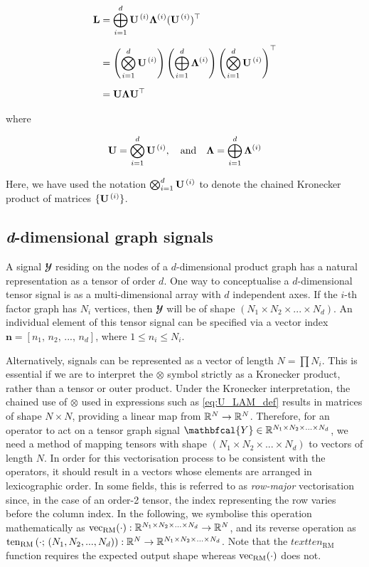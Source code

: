 \begin{align}
    \mathbf{L} &= \bigoplus_{i=1}^d \mathbf{U}^{\,(i)} \mathbf{\Lambda}^{(i)} (\mathbf{U}^{\,(i)})^\top \notag \\[0.2cm]
    &= \left( \bigotimes_{i=1}^d  \mathbf{U}^{\,(i)} \right) \left(\bigoplus_{i=1}^d \mathbf{\Lambda}^{(i)} \right) \left(\bigotimes_{i=1}^d  \mathbf{U}^{\,(i)} \right)^\top \notag \\[0.2cm]
    &= \mathbf{U} \mathbf{\Lambda} \mathbf{U}^\top 
\end{align}

\noindent where 

\begin{equation}
    \label{eq:U_LAM_def}
    \mathbf{U} =  \bigotimes_{i=1}^d  \mathbf{U}^{\,(i)} , \quad \text{and} \quad \mathbf{\Lambda} =  \bigoplus_{i=1}^d \mathbf{\Lambda}^{(i)}
\end{equation}


Here, we have used the notation $\bigotimes_{i=1}^d  \mathbf{U}^{\,(i)}$ to denote the chained Kronecker product of matrices $\{\mathbf{U}^{\,(i)}  \}$. 

\subsection{\textit{d}-dimensional graph signals}

A signal $\mathbfcal{Y}$ residing on the nodes of a $d$-dimensional product graph has a natural representation as a tensor of order $d$. One way to conceptualise a $d$-dimensional tensor signal is as a multi-dimensional array with $d$ independent axes. If the $i$-th factor graph has $N_i$ vertices, then $\mathbfcal{Y}$ will be of shape $(N_1 \times N_2 \times ... \times N_d)$. An individual element of this tensor signal can be specified via a vector index $\mathbf{n} = [n_1,\, n_2,\, ...,\, n_d]$, where $1\leq n_i \leq N_i$.

Alternatively, signals can be represented as a vector of length $N = \prod N_i$. This is essential if we are to interpret the $\otimes$ symbol strictly as a Kronecker product, rather than a tensor or outer product. Under the Kronecker interpretation, the chained use of $\otimes$ used in expressions such as \cref{eq:U_LAM_def} results in matrices of shape $N \times N$, providing a linear map from $\mathbb{R}^{N} \rightarrow \mathbb{R}^{N}$. Therefore, for an operator to act on a tensor graph signal $\mathbfcal{Y} \in \R^{N_1 \times N_2 \times ... \times N_d}$, we need a method of mapping tensors with shape $(N_1 \times N_2 \times ... \times N_d)$ to vectors of length $N$. In order for this vectorisation process to be consistent with the operators, it should result in a vectors whose elements are arranged in lexicographic order. In some fields, this is referred to as \textit{row-major} vectorisation since, in the case of an order-2 tensor, the index representing the row varies before the column index. In the following, we symbolise this operation mathematically as $\text{\textup{vec}}_{\text{\textup{RM}}}(\cdot): \mathbb{R}^{N_1 \times N_2 \times ... \times N_d} \rightarrow \mathbb{R}^N$, and its reverse operation as $\text{ten}_\text{RM}\left(\cdot; \, (N_1, N_2, ..., N_d)\right): \mathbb{R}^N \rightarrow \mathbb{R}^{N_1 \times N_2 \times ... \times N_d}$. Note that the $text{ten}_\text{RM}$ function requires the expected output shape whereas $\text{\textup{vec}}_{\text{\textup{RM}}}(\cdot)$ does not. 

